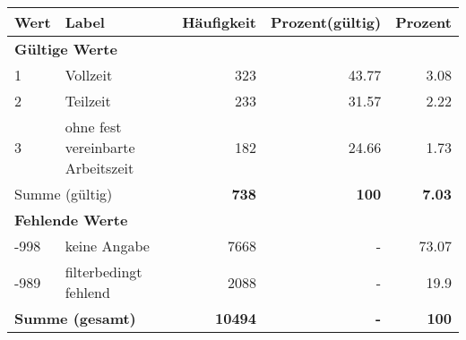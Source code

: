      \begin{longtable}{lXrrr}
     \toprule
     \textbf{Wert} & \textbf{Label} & \textbf{Häufigkeit} & \textbf{Prozent(gültig)} & \textbf{Prozent} \\
     \endhead
     \midrule
     \multicolumn{5}{l}{\textbf{Gültige Werte}}\\

     1 &
     \multicolumn{1}{X}{ Vollzeit   } &


       \num{323} &
       \num[round-mode=places,round-precision=2]{43.77} &
         \num[round-mode=places,round-precision=2]{3.08} \\

     2 &
     \multicolumn{1}{X}{ Teilzeit   } &


       \num{233} &
       \num[round-mode=places,round-precision=2]{31.57} &
         \num[round-mode=places,round-precision=2]{2.22} \\

     3 &
     \multicolumn{1}{X}{ ohne fest vereinbarte Arbeitszeit   } &


       \num{182} &
       \num[round-mode=places,round-precision=2]{24.66} &
         \num[round-mode=places,round-precision=2]{1.73} \\
     \midrule
     \multicolumn{2}{l}{Summe (gültig)} &
       \textbf{\num{738}} &
     \textbf{\num{100}} &
       \textbf{\num[round-mode=places,round-precision=2]{7.03}} \\
     \multicolumn{5}{l}{\textbf{Fehlende Werte}}\\
       -998 &
       keine Angabe &
         \num{7668} &
        - &
         \num[round-mode=places,round-precision=2]{73.07} \\
       -989 &
       filterbedingt fehlend &
         \num{2088} &
        - &
         \num[round-mode=places,round-precision=2]{19.9} \\
     \midrule
     \multicolumn{2}{l}{\textbf{Summe (gesamt)}} &
          \textbf{\num{10494}} &
        \textbf{-} &
        \textbf{\num{100}} \\
     \bottomrule
     \end{longtable}
     
